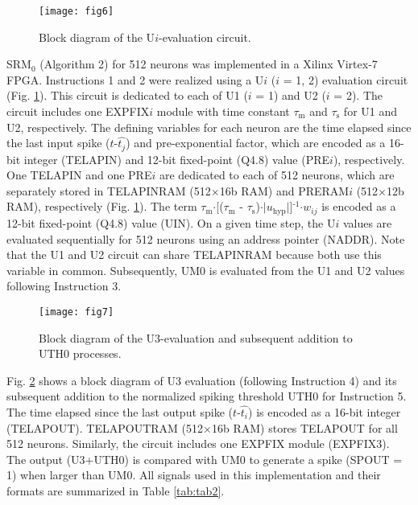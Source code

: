 \documentclass[10pt,journal]{IEEEtran}
\begin{document}
\begin{figure}[t]\centering
    \texttt{[image: fig6]}
    \caption{\label{fig:fig6} Block diagram of the U$i$-evaluation circuit.}
\end{figure}

SRM$_\textrm{0}$ (Algorithm 2) for 512 neurons was implemented in a Xilinx Virtex-7 FPGA. 
Instructions 1 and 2 were realized using a U$i$ ($i$ = 1, 2) evaluation circuit (Fig. \ref{fig:fig6}).
This circuit is dedicated to each of U1 ($i$ = 1) and U2 ($i$ = 2). 
The circuit includes one EXP\textunderscore FIX$i$ module with time constant $\tau_\textrm{m}$ and $\tau_\textrm{s}$ for U1 and U2, respectively. 
The defining variables for each neuron are the time elapsed since the last input spike ($t$-$\hat{t_j}$) and pre-exponential factor, which are encoded as a 16-bit integer (T\textunderscore ELAP\textunderscore IN) and 12-bit fixed-point (Q4.8) value (PRE$i$), respectively.
One T\textunderscore ELAP\textunderscore IN and one PRE$i$ are dedicated to each of 512 neurons, which are separately stored in T\textunderscore ELAP\textunderscore IN\textunderscore RAM (512$\times$16b RAM) and PRE\textunderscore RAM$i$ (512$\times$12b RAM), respectively (Fig. \ref{fig:fig6}).  
The term $\tau_\textrm{m}$$\cdot$[($\tau_\textrm{m}$ - $\tau_\textrm{s}$)$\cdot$$\mathrm{\lvert}$$u_\textrm{hyp}$$\mathrm{\lvert}$]$^\textrm{-1}$$\cdot$$w_{ij}$ is encoded as a 12-bit fixed-point (Q4.8) value (U\textunderscore IN). 
On a given time step, the U$i$ values are evaluated sequentially for 512 neurons using an address pointer (N\textunderscore ADDR). Note that the U1 and U2 circuit can share T\textunderscore ELAP\textunderscore IN\textunderscore RAM because both use this variable in common. Subsequently, UM0 is evaluated from the U1 and U2 values following Instruction 3. 

\begin{figure}[t]\centering
    \texttt{[image: fig7]}
    \caption{\label{fig:fig7} Block diagram of the U3-evaluation and subsequent addition to UTH0 processes.}
\end{figure}

Fig. \ref{fig:fig7} shows a block diagram of U3 evaluation (following Instruction 4) and its subsequent addition to the normalized spiking threshold UTH0 for Instruction 5. 
The time elapsed since the last output spike ($t$-$\hat{t_i}$) is encoded as a 16-bit integer (T\textunderscore ELAP\textunderscore OUT). 
T\textunderscore ELAP\textunderscore OUT\textunderscore RAM (512$\times$16b RAM) stores T\textunderscore ELAP\textunderscore OUT for all 512 neurons. 
Similarly, the circuit includes one EXP\textunderscore FIX module (EXP\textunderscore FIX3).
The output (U3+UTH0) is compared with UM0 to generate a spike (SP\textunderscore OUT = 1) when larger than UM0. 
All signals used in this implementation and their formats are summarized in Table \ref{tab:tab2}.
\end{document}
